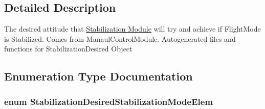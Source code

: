 \subsection{\-Detailed \-Description}
\-The desired attitude that \hyperlink{group___stabilization_module}{\-Stabilization \-Module} will try and achieve if \-Flight\-Mode is \-Stabilized. \-Comes from \-Manaul\-Control\-Module. \-Autogenerated files and functions for \-Stabilization\-Desired \-Object 

\subsection{\-Enumeration \-Type \-Documentation}
\hypertarget{group___stabilization_desired_gab5327ad9058cb809514e48b3600d11df}{
\subsubsection[{\-Stabilization\-Desired\-Stabilization\-Mode\-Elem}]{\setlength{\rightskip}{0pt plus 5cm}enum {\bf \-Stabilization\-Desired\-Stabilization\-Mode\-Elem}}}\label{group___stabilization_desired_gab5327ad9058cb809514e48b3600d11df}
